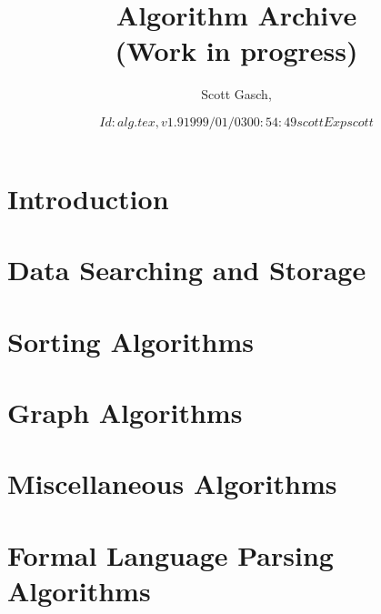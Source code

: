 \documentclass[12pt]{book}
\title{Algorithm Archive
\\
{\large (Work in progress)}}
\author{Scott Gasch, \htmladdnormallink{scott@wannabe.guru.org}{mailto:scott@wannabe.guru.org}}
\date{ $Id: alg.tex,v 1.9 1999/01/03 00:54:49 scott Exp scott $ }
\begin{document}

\maketitle


\tableofcontents


\section{Introduction}



\section{Data Searching and Storage}



\section{Sorting Algorithms}



\section{Graph Algorithms}



\section{Miscellaneous Algorithms}



\section{Formal Language Parsing Algorithms}

\end{document}
